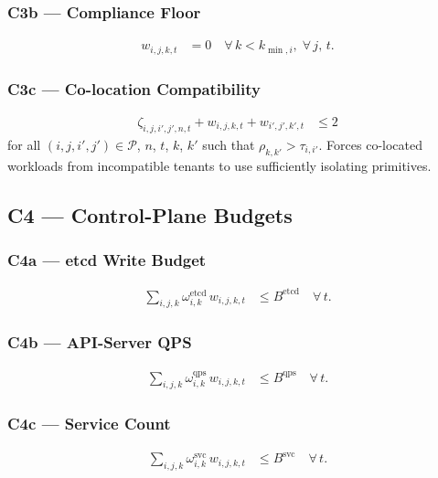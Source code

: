 \documentclass[11pt,a4paper]{article}
\begin{document}
\subsubsection*{C3b --- Compliance Floor}
\begin{align}
  w_{i,j,k,t} &= 0
  \quad \forall\,k < k_{\min,i},\;\forall\,j,\,t.
  \tag{C3b}
\end{align}

\subsubsection*{C3c --- Co-location Compatibility}
\begin{align}
  \zeta_{i,j,i',j',n,t} + w_{i,j,k,t} + w_{i',j',k',t} &\le 2
  \tag{C3c}
\end{align}
for all $(i,j,i',j')\in\mathcal{P}$, $n$, $t$, $k$, $k'$ such that
$\rho_{k,k'} > \tau_{i,i'}$.  Forces co-located workloads from
incompatible tenants to use sufficiently isolating primitives.

\subsection{C4 --- Control-Plane Budgets}

\subsubsection*{C4a --- etcd Write Budget}
\begin{align}
  \sum_{i,j,k} \omega_{i,k}^{\text{etcd}}\,w_{i,j,k,t}
  &\le B^{\text{etcd}}
  \quad \forall\,t.
  \tag{C4a}
\end{align}

\subsubsection*{C4b --- API-Server QPS}
\begin{align}
  \sum_{i,j,k} \omega_{i,k}^{\text{qps}}\,w_{i,j,k,t}
  &\le B^{\text{qps}}
  \quad \forall\,t.
  \tag{C4b}
\end{align}

\subsubsection*{C4c --- Service Count}
\begin{align}
  \sum_{i,j,k} \omega_{i,k}^{\text{svc}}\,w_{i,j,k,t}
  &\le B^{\text{svc}}
  \quad \forall\,t.
  \tag{C4c}
\end{align}
\end{document}

